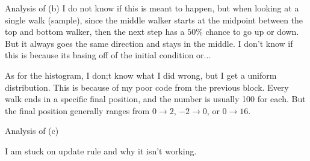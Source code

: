 \documentclass[12pt]{article}
\newenvironment{theorem}[2][Theorem]{\begin{trivlist}
\item[\hskip \labelsep {\bfseries #1}\hskip \labelsep {\bfseries #2.}]}{\end{trivlist}}
\begin{document}
Analysis of (b)
I do not know if this is meant to happen, but when looking at a single walk (sample), since the middle walker starts at the midpoint 
between the top and bottom walker, then the next step has a $50\%$ chance to go up or down. But it always goes the same 
direction and stays in the middle. I don't know if this is because its basing off of the initial condition or...

As for the histogram, I don;t know what I did wrong, but I get a uniform distribution. This is because of my poor code from the 
previous block. Every walk ends in a specific final position, and the number is usually 100 for each. But the final position generally 
ranges from $0\to 2$, $-2\to 0$, or $0\to 16$. 


Analysis of (c)

I am stuck on update rule and why it isn't working.





% 
%
%
%
%
%








 
\end{document}
